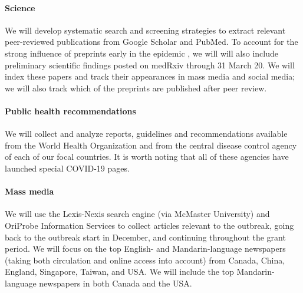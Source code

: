 



\paragraph{Science} We will develop systematic search and screening strategies to extract relevant peer-reviewed publications from Google Scholar and PubMed. To account for the strong influence of preprints early in the epidemic \cite{MajuMandPRE}, we will will also include preliminary scientific findings posted on medRxiv through 31 March 20. We will index these papers and track their appearances in mass media and social media; we will also track which of the preprints are published after peer review.

\paragraph{Public health recommendations}

We will collect and analyze reports, guidelines and recommendations available from the World Health Organization and from the central disease control agency of each of our focal countries. It is worth noting that all of these agencies have launched special COVID-19 pages.

\paragraph{Mass media}

We will use the Lexis-Nexis search engine (via McMaster University) and OriProbe Information Services to collect articles relevant to the outbreak, going back to the outbreak start in December, and continuing throughout the grant period. 
We will focus on the top English- and Mandarin-language newspapers (taking both circulation and online access into account) from 
Canada, China, England, Singapore, Taiwan, and USA.
We will include the top Mandarin-language newspapers in both Canada and the USA.

